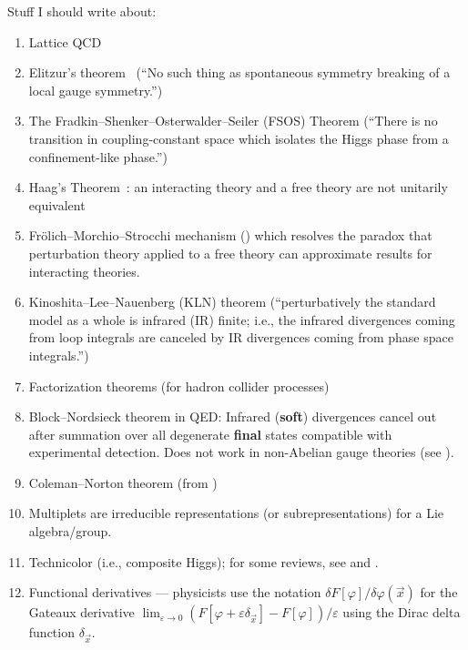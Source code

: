 Stuff I should write about:
\begin{enumerate}
\item Lattice QCD~\cite{Lepage:1998dt}
\item Elitzur's theorem~\cite{Elitzur:1975im} (``No such thing as spontaneous symmetry breaking of a local gauge symmetry.'')
\item The Fradkin--Shenker--Osterwalder--Seiler (FSOS) Theorem (``There is no transition in coupling-constant space which isolates the Higgs phase from a confinement-like phase.'')
\item Haag's Theorem~\cite{Haag:1992hx}: an interacting theory and a
  free theory are not unitarily equivalent
\item Fr\"{o}lich--Morchio--Strocchi mechanism ()
  which resolves the paradox that perturbation theory applied to a free
  theory can approximate results for interacting theories.
\item Kinoshita--Lee--Nauenberg (KLN) theorem (``perturbatively the standard model as a whole is infrared (IR) finite; i.e., the infrared divergences coming from loop integrals are canceled by IR divergences coming from phase space integrals.'')
\item Factorization theorems (for hadron collider processes) 
\item Block--Nordsieck theorem in QED: Infrared (\textbf{soft}) divergences
  cancel out after summation over all degenerate \textbf{final} states
  compatible with experimental detection. Does not work in non-Abelian
  gauge theories (see {\tt{}}).
\item Coleman--Norton theorem (from {\tt{}})
\item Multiplets are irreducible representations (or subrepresentations)
  for a Lie algebra/group.
\item Technicolor (i.e., composite Higgs); for some reviews, see
   and .
\item Functional derivatives --- physicists use the notation $\delta F[\varphi]/\delta\varphi(\vec{x})$
  for the Gateaux derivative $\lim_{\varepsilon\to 0}(F[\varphi+\varepsilon\delta_{\vec{x}}]-F[\varphi])/\varepsilon$
  using the Dirac delta function $\delta_{\vec{x}}$.
\end{enumerate}






